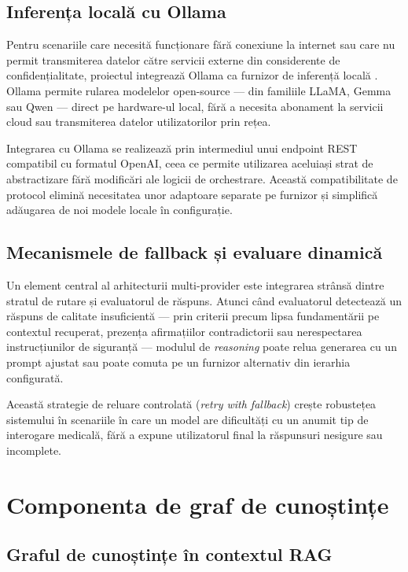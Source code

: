 \documentclass[12pt, a4paper, oneside, romanian]{teza-upb}
\begin{document}
\subsection{Inferența locală cu Ollama}

Pentru scenariile care necesită funcționare fără conexiune la internet sau care nu permit transmiterea datelor către servicii externe din considerente de confidențialitate, proiectul integrează Ollama ca furnizor de inferență locală \cite{ollama_doc}. Ollama permite rularea modelelor open-source — din familiile LLaMA, Gemma sau Qwen — direct pe hardware-ul local, fără a necesita abonament la servicii cloud sau transmiterea datelor utilizatorilor prin rețea.

Integrarea cu Ollama se realizează prin intermediul unui endpoint REST compatibil cu formatul OpenAI, ceea ce permite utilizarea aceluiași strat de abstractizare fără modificări ale logicii de orchestrare. Această compatibilitate de protocol elimină necesitatea unor adaptoare separate pe furnizor și simplifică adăugarea de noi modele locale în configurație.

\subsection{Mecanismele de fallback și evaluare dinamică}

Un element central al arhitecturii multi-provider este integrarea strânsă dintre stratul de rutare și evaluatorul de răspuns. Atunci când evaluatorul detectează un răspuns de calitate insuficientă — prin criterii precum lipsa fundamentării pe contextul recuperat, prezența afirmațiilor contradictorii sau nerespectarea instrucțiunilor de siguranță — modulul de \textit{reasoning} poate relua generarea cu un prompt ajustat sau poate comuta pe un furnizor alternativ din ierarhia configurată.

Această strategie de reluare controlată (\textit{retry with fallback}) crește robustețea sistemului în scenariile în care un model are dificultăți cu un anumit tip de interogare medicală, fără a expune utilizatorul final la răspunsuri nesigure sau incomplete.

\section{Componenta de graf de cunoștințe}

\subsection{Graful de cunoștințe în contextul RAG}
\end{document}
